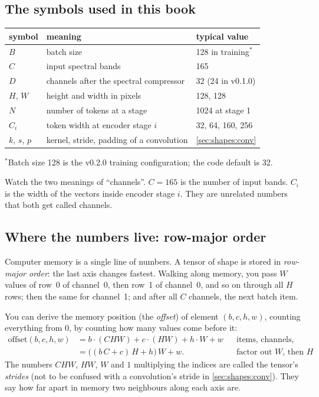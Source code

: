 \subsection{The symbols used in this book}

\begin{center}
\begin{tabular}{lll}
\toprule
symbol & meaning & typical value\\
\midrule
$B$ & batch size & 128 in training$^{\ast}$\\
$C$ & input spectral bands & 165\\
$D$ & channels after the spectral compressor & 32 (24 in v0.1.0)\\
$H$, $W$ & height and width in pixels & 128, 128\\
$N$ & number of tokens at a stage & 1024 at stage 1\\
$C_i$ & token width at encoder stage $i$ & 32, 64, 160, 256\\
$k$, $s$, $p$ & kernel, stride, padding of a convolution & \cref{sec:shapes:conv}\\
\bottomrule
\end{tabular}
\end{center}
{\small $^{\ast}$Batch size 128 is the v0.2.0 training
configuration; the code default is 32.}

Watch the two meanings of ``channels''. $C=165$ is the number of input bands. $C_i$ is the width of
the vectors inside encoder stage $i$. They are unrelated numbers that both get called channels.

\subsection{Where the numbers live: row-major order}\label{sec:shapes:memory}

Computer memory is a single line of numbers. A tensor of shape  is stored in
\emph{row-major order}: the last axis changes fastest. Walking along memory, you
pass $W$ values of row~0 of channel~0, then row~1 of channel~0, and so on through all $H$ rows; then
the same for channel~1; and after all $C$ channels, the next batch item.

You can derive the memory position (the \emph{offset}) of element $(b,c,h,w)$, counting everything
from $0$, by counting how many values come before it:
\begin{align*}
\text{offset}(b,c,h,w)
&= b\cdot(CHW) + c\cdot(HW) + h\cdot W + w
  && \text{items, channels, rows, columns before it}\\
&= \bigl((b\,C + c)\,H + h\bigr)\,W + w.
  && \text{factor out $W$, then $H$}
\end{align*}
The numbers $CHW$, $HW$, $W$ and $1$ multiplying the indices are called the tensor's
\emph{strides} (not to be confused with a convolution's stride in
\cref{sec:shapes:conv}). They say how far apart in memory two neighbours along each axis are.

